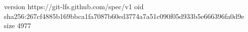 version https://git-lfs.github.com/spec/v1
oid sha256:267cf4885b169bbca1fa7087b60ed3774a7a51c090f05d933b5e666396fa0d9e
size 4977
